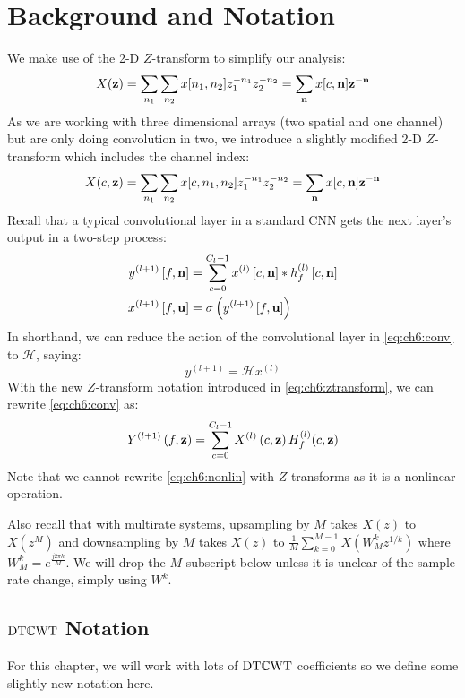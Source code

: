 \section{Background and Notation}
We make use of the 2-D $Z$-transform to simplify our analysis:
%
\begin{equation}
  X(\mathbf{z}) = \sum_{n_1}\sum_{n_2} x[n_1, n_2]z_1^{-n_1}z_2^{-n_2} =
  \sum_{\mathbf{n}}x[c, \mathbf{n}]\mathbf{z}^{-\mathbf{n}}
\end{equation}
%
As we are working with three dimensional arrays (two spatial and one channel) but are
only doing convolution in two, we introduce a slightly modified 2-D $Z$-transform
which includes the channel index:
%
\begin{equation}
  X(c, \mathbf{z}) = \sum_{n_1}\sum_{n_2} x[c, n_1, n_2]z_1^{-n_1}z_2^{-n_2} =
  \sum_{\mathbf{n}}x[c, \mathbf{n}]\mathbf{z}^{-\mathbf{n}} \label{eq:ch6:ztransform}
\end{equation}
%
Recall that a typical convolutional
layer in a standard CNN gets the next layer's output in a two-step process:
%
\begin{align} 
  y^{(l+1)}\left[f, \mathbf{n}\right] &= \sum_{c=0}^{C_l - 1} x^{(l)}\left[c, \mathbf{n}\right] \ast h^{(l)}_{f}\left[c, \mathbf{n} \right]
    \label{eq:ch6:conv}\\
    x^{(l+1)}\left[f, \mathbf{u}\right] & =  \sigma \left( y^{(l+1)}\left[f, \mathbf{u}\right] \right) \label{eq:ch6:nonlin}
\end{align}
%
In shorthand, we can reduce the action of the convolutional layer in \eqref{eq:ch6:conv} to $\mathcal{H}$, saying:
\begin{equation}
  y^{(l+1)} = \mathcal{H}x^{(l)}
\end{equation}
%
With the new $Z$-transform notation introduced in \eqref{eq:ch6:ztransform}, we
can rewrite \eqref{eq:ch6:conv} as:
%
\begin{equation}
  Y^{(l+1)}\left(f, \mathbf{z}\right) = \sum_{c=0}^{C_l - 1} X^{(l)}\left(c, \mathbf{z}\right) H_f^{(l)}(c, \mathbf{z})
\end{equation}
%
Note that we cannot rewrite \eqref{eq:ch6:nonlin} with $Z$-transforms as it is a nonlinear
operation.

Also recall that with multirate systems, upsampling by $M$ takes $X(z)$ to
$X(z^M)$ and downsampling by $M$ takes $X(z)$ to $\frac{1}{M}\sum_{k=0}^{M-1} X(W_M^k
z^{1/k})$ where $W_M^k = e^{\frac{j2\pi k}{M}}$. We will drop the $M$ subscript
below unless it is unclear of the sample rate change, simply using $W^k$.

\subsection{$\mathrm{DT}\mathbb{C}\mathrm{WT}$ Notation}
For this chapter, we will work with lots of $\mathrm{DT}\mathbb{C}\mathrm{WT}$ coefficients so we define
some slightly new notation here.

